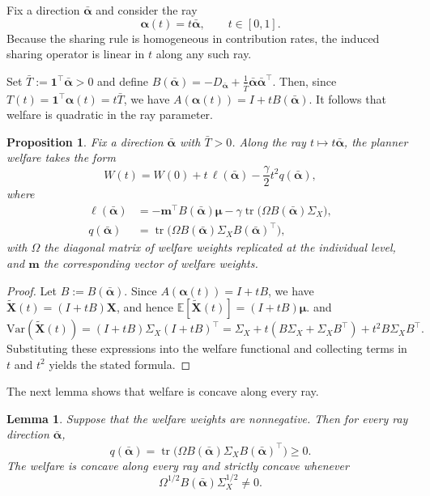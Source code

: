 \documentclass[a4paper,12pt]{article}
\newtheorem{proposition}[theorem]{Proposition}
\newtheorem{lemma}[theorem]{Lemma}
\theoremstyle{definition}
\theoremstyle{remark}
\newcommand{\E}{\mathbb{E}}
\newcommand{\Var}{\mathrm{Var}}
\newcommand{\1}{\mathbf{1}}
\begin{document}
Fix a direction \(\bar{\boldsymbol{\alpha}}\) and consider the ray
\[
\boldsymbol{\alpha}(t)=t\bar{\boldsymbol{\alpha}},
\qquad t\in[0,1].
\]
Because the sharing rule is homogeneous in contribution rates, the induced sharing operator is linear in \(t\) along any such ray.

Set \(\bar T:=\1^\top\bar{\boldsymbol{\alpha}}>0\) and define
\(B(\bar{\boldsymbol{\alpha}})
=
- D_{\bar{\boldsymbol{\alpha}}}
+
\frac{1}{\bar T}\bar{\boldsymbol{\alpha}}\bar{\boldsymbol{\alpha}}^\top\).
Then, since \(T(t)=\1^\top\boldsymbol{\alpha}(t)=t\bar T\), we have
\(A(\boldsymbol{\alpha}(t))=I+tB(\bar{\boldsymbol{\alpha}})\).
It follows that welfare is quadratic in the ray parameter.

\begin{proposition}\label{prop:ray-welfare-general}
Fix a direction \(\bar{\boldsymbol{\alpha}}\) with \(\bar T>0\). Along the ray \(t\mapsto t\bar{\boldsymbol{\alpha}}\), the planner welfare takes the form
\[
W(t)=W(0)+t\,\ell(\bar{\boldsymbol{\alpha}})-\frac{\gamma}{2}t^2 q(\bar{\boldsymbol{\alpha}}),
\]
where
\begin{align*}
\ell(\bar{\boldsymbol{\alpha}})
&=
-\mathbf m^\top B(\bar{\boldsymbol{\alpha}})\boldsymbol{\mu}
-
\gamma\operatorname{tr}\!\big(\Omega B(\bar{\boldsymbol{\alpha}})\Sigma_X\big),\\
q(\bar{\boldsymbol{\alpha}})
&=
\operatorname{tr}\!\big(\Omega B(\bar{\boldsymbol{\alpha}})\Sigma_X B(\bar{\boldsymbol{\alpha}})^\top\big),
\end{align*}
with \(\Omega\) the diagonal matrix of welfare weights replicated at the individual level, and \(\mathbf m\) the corresponding vector of welfare weights.
\end{proposition}

\begin{proof}
Let \(B:=B(\bar{\boldsymbol{\alpha}})\). Since \(A(\boldsymbol{\alpha}(t))=I+tB\), we have
\(\tilde{\mathbf X}(t)=(I+tB)\mathbf X\), and hence
\(\E[\tilde{\mathbf X}(t)]=(I+tB)\boldsymbol{\mu}\).
and
\[
\Var(\tilde{\mathbf X}(t))
=
(I+tB)\Sigma_X(I+tB)^\top
=
\Sigma_X+t(B\Sigma_X+\Sigma_XB^\top)+t^2B\Sigma_XB^\top.
\]
Substituting these expressions into the welfare functional and collecting terms in \(t\) and \(t^2\) yields the stated formula.
\end{proof}

The next lemma shows that welfare is concave along every ray.
\begin{lemma}\label{lem:concavity-general}
Suppose that the welfare weights are nonnegative. Then for every ray direction
\(\bar{\boldsymbol{\alpha}}\),
\[
q(\bar{\boldsymbol{\alpha}})
=
\operatorname{tr}\!\bigl(\Omega B(\bar{\boldsymbol{\alpha}})\Sigma_X
B(\bar{\boldsymbol{\alpha}})^\top\bigr)
\ge 0.
\]
The welfare is concave along every ray and strictly concave whenever
\[
\Omega^{1/2}B(\bar{\boldsymbol{\alpha}})\Sigma_X^{1/2}\neq 0.
\]
\end{lemma}
\end{document}
